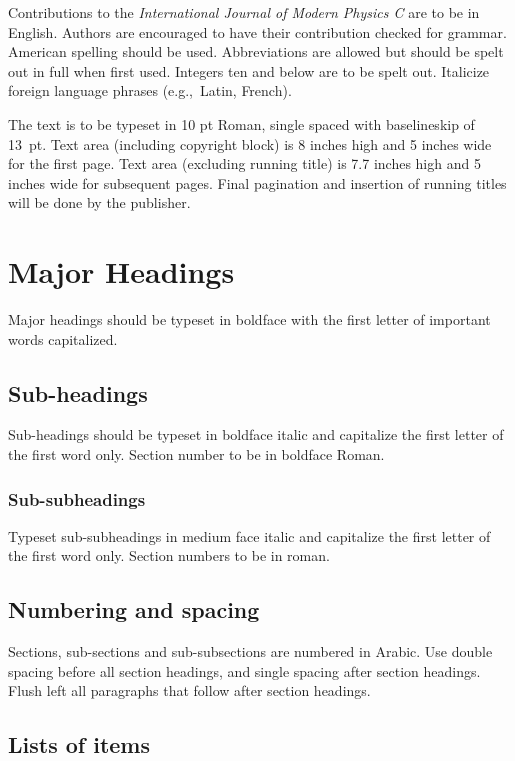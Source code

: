\documentclass{ws-ijmpc}
\begin{document}
Contributions to the {\it International Journal of Modern Physics C\/}
are to be in\break
English. Authors are encouraged to have their
contribution checked for grammar. American spelling should be
used. Abbreviations are allowed but should be spelt out in full when
first used. Integers ten and below are to be spelt out. Italicize
foreign language phrases (e.g.,~Latin, French).

The text is to be typeset in 10 pt Roman, single spaced with
baselineskip of 13~pt. Text area (including copyright block)
is 8 inches high and 5 inches wide for the first page.  Text area
(excluding running title) is 7.7 inches high and 5 inches wide for
subsequent pages.  Final pagination and insertion of running titles
will be done by the publisher.

\section{Major Headings}

Major headings should be typeset in boldface with the first
letter of important words capitalized.

\subsection{Sub-headings}

Sub-headings should be typeset in boldface italic and capitalize
the first letter of the first word only. Section number to be in
boldface Roman.

\subsubsection{Sub-subheadings}

Typeset sub-subheadings in medium face italic and capitalize the
first letter of the first word only. Section numbers to be in
roman.

\subsection{Numbering and spacing}

Sections, sub-sections and sub-subsections are numbered in
Arabic.  Use double spacing before all section headings, and
single spacing after section headings. Flush left all paragraphs
that follow after section headings.

\subsection{Lists of items}
\end{document}
